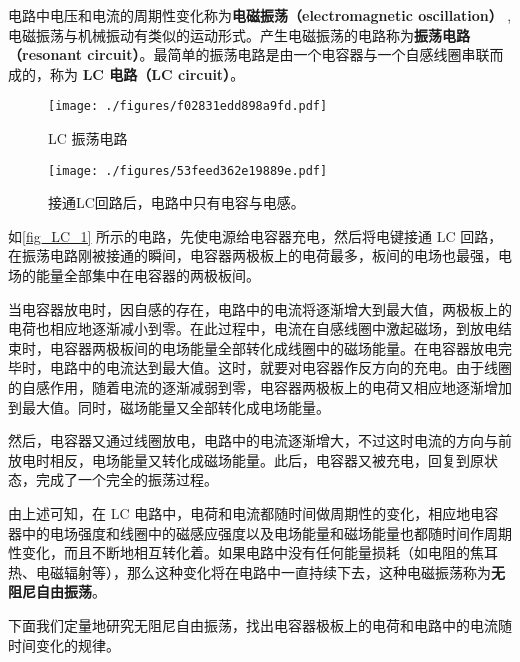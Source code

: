 

电路中电压和电流的周期性变化称为\textbf{电磁振荡（electromagnetic oscillation）} , 电磁振荡与机械振动有类似的运动形式。产生电磁振荡的电路称为\textbf{振荡电路（resonant circuit）}。最简单的振荡电路是由一个电容器与一个自感线圈串联而成的，称为\textbf{ LC 电路（LC circuit）}。
\begin{figure}[ht]
\centering
\texttt{[image: ./figures/f02831edd898a9fd.pdf]}
\caption{LC 振荡电路} \label{fig_LC_1}
\end{figure}
\begin{figure}[ht]
\centering
\texttt{[image: ./figures/53feed362e19889e.pdf]}
\caption{接通LC回路后，电路中只有电容与电感。} \label{fig_LC_3}
\end{figure}
如\autoref{fig_LC_1} 所示的电路，先使电源给电容器充电，然后将电键接通 LC 回路，在振荡电路刚被接通的瞬间，电容器两极板上的电荷最多，板间的电场也最强，电场的能量全部集中在电容器的两极板间。

当电容器放电时，因自感的存在，电路中的电流将逐渐增大到最大值，两极板上的电荷也相应地逐渐减小到零。在此过程中，电流在自感线圈中激起磁场，到放电结束时，电容器两极板间的电场能量全部转化成线圈中的磁场能量。在电容器放电完毕时，电路中的电流达到最大值。这时，就要对电容器作反方向的充电。由于线圈的自感作用，随着电流的逐渐减弱到零，电容器两极板上的电荷又相应地逐渐增加到最大值。同时，磁场能量又全部转化成电场能量。

然后，电容器又通过线圈放电，电路中的电流逐渐增大，不过这时电流的方向与前放电时相反，电场能量又转化成磁场能量。此后，电容器又被充电，回复到原状态，完成了一个完全的振荡过程。

由上述可知，在 LC 电路中，电荷和电流都随时间做周期性的变化，相应地电容器中的电场强度和线圈中的磁感应强度以及电场能量和磁场能量也都随时间作周期性变化，而且不断地相互转化着。如果电路中没有任何能量损耗（如电阻的焦耳热、电磁辐射等），那么这种变化将在电路中一直持续下去，这种电磁振荡称为\textbf{无阻尼自由振荡}。

下面我们定量地研究无阻尼自由振荡，找出电容器极板上的电荷和电路中的电流随时间变化的规律。

